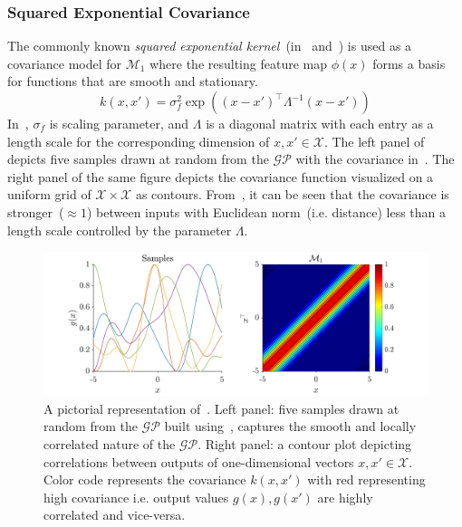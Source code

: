 \subsubsection{Squared Exponential Covariance}
The commonly known \textit{squared exponential kernel}~(in~ and~) is used as a covariance model for \(\mathcal{M}_1\) where the resulting feature map \(\phi(x)\) forms a basis for functions that are smooth and stationary.
\begin{equation}
    k(x,x')=\sigma_f^2 \exp((x-x')^{\top}\Lambda^{-1}(x-x'))
    \label{eq:covSEard}
\end{equation}
In~, \(\sigma_f\) is scaling parameter, and \(\Lambda\) is a diagonal matrix with each entry as a length scale for the corresponding dimension of \(x,x'\in \mathcal{X}\). 
The left panel of  depicts five samples drawn at random from the \(\mathcal{GP}\) with the covariance in~.%
The right panel of the same figure depicts the covariance function visualized on a uniform grid of \(\mathcal{X}\times\mathcal{X}\) as contours. 
From~, it can be seen that the covariance is stronger~(\(\approx 1\)) between inputs with Euclidean norm~(i.e. distance) less than a length scale controlled by the parameter \(\Lambda\).

\begin{figure}[h]
    \centering
    \includegraphics[scale=0.5]{Chapter-3/figures/Model1.png}
    \caption{A pictorial representation of~. Left panel: five samples drawn at random from the \(\mathcal{GP}\) built using~, captures the smooth and locally correlated nature of the \(\mathcal{GP}\). Right panel: a contour plot depicting correlations between outputs of one-dimensional vectors \(x,x' \in \mathcal{X}\). Color code represents the covariance \(k(x,x')\) with red representing high covariance i.e. output values \(g(x), g(x')\) are highly correlated and vice-versa. }
    \label{fig:covSEard}
\end{figure}

